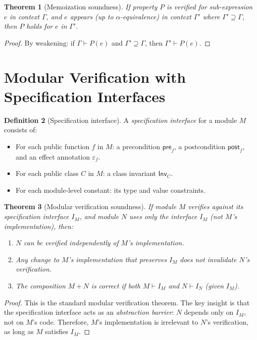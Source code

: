 \documentclass[11pt,a4paper]{report}
\theoremstyle{definition}
\newtheorem{definition}{Definition}[chapter]
\theoremstyle{plain}
\newtheorem{theorem}[definition]{Theorem}
\begin{document}
\begin{theorem}[Memoization soundness]
If property $P$ is verified for sub-expression $e$ in context $\Gamma$,
and $e$ appears (up to $\alpha$-equivalence) in context $\Gamma'$ where
$\Gamma' \supseteq \Gamma$, then $P$ holds for $e$ in $\Gamma'$.
\end{theorem}
\begin{proof}
By weakening: if $\Gamma \vdash P(e)$ and $\Gamma' \supseteq \Gamma$, then
$\Gamma' \vdash P(e)$.
\end{proof}


\section{Modular Verification with Specification Interfaces}

\begin{definition}[Specification interface]
A \emph{specification interface} for a module $M$ consists of:
\begin{itemize}
  \item For each public function $f$ in $M$: a precondition $\mathsf{pre}_f$, a postcondition
    $\mathsf{post}_f$, and an effect annotation $\varepsilon_f$.
  \item For each public class $C$ in $M$: a class invariant $\mathsf{Inv}_C$.
  \item For each module-level constant: its type and value constraints.
\end{itemize}
\end{definition}

\begin{theorem}[Modular verification soundness]
If module $M$ verifies against its specification interface $I_M$, and module $N$
uses only the interface $I_M$ (not $M$'s implementation), then:
\begin{enumerate}
  \item $N$ can be verified independently of $M$'s implementation.
  \item Any change to $M$'s implementation that preserves $I_M$ does not
    invalidate $N$'s verification.
  \item The composition $M + N$ is correct if both $M \vdash I_M$ and $N \vdash I_N$
    (given $I_M$).
\end{enumerate}
\end{theorem}
\begin{proof}
This is the standard modular verification theorem.  The key insight is that
the specification interface acts as an \emph{abstraction barrier}: $N$ depends
only on $I_M$, not on $M$'s code.  Therefore, $M$'s implementation is
irrelevant to $N$'s verification, as long as $M$ satisfies $I_M$.
\end{proof}
\end{document}
